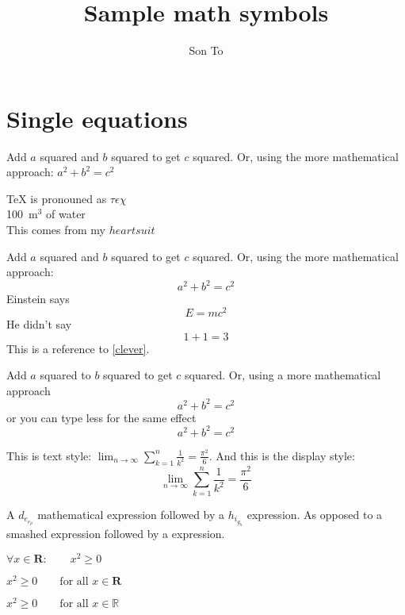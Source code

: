 \documentclass[a4paper,11pt]{report}
\author{Son To}
\title{Sample math symbols}
\begin{document}
\maketitle
\tableofcontents
\chapter{Single equations}
Add $a$ squared and $b$ squared to get $c$ squared. Or,
using the more mathematical approach:
$a^2 + b^2 = c^2$ %

\TeX{} is pronouned as $\tau\epsilon\chi$\\[5pt] %
100~m$^3$ of water\\[5pt]
This comes from my $heartsuit$

Add $a$ squared and $b$ squared to get $c$ squared. Or,
using the more mathematical approach:
\begin{equation}
  a^2 + b^2 = c^2 %
\end{equation}
Einstein says
\begin{equation}
  E = mc^2 \label{clever}
\end{equation}
He didn't say
\begin{equation}
  1 + 1 = 3 \tag{bollocks}
\end{equation}
This is a reference to \eqref{clever}.

Add $a$ squared to $b$ squared to get $c$ squared. Or, using
a more mathematical approach
\begin{equation*}
  a^2 + b^2 = c^2
\end{equation*}
or you can type less for the same effect
\[ a^2 + b^2 = c^2 \]

This is text style: $\lim_{n \to \infty}
\sum_{k=1}^n \frac{1}{k^2} = \frac{\pi^2}{6}$.
And this is the display style:
\begin{equation}
  \lim_{n \to \infty} \sum_{k=1}^n \frac{1}{k^2}
  = \frac{\pi^2}{6}
\end{equation}

A $d_{e_{e_p}}$ mathematical expression followed
by a $h_{i_{g_h}}$ expression. As opposed to a smashed
 expression followed by a
 expression.

$\forall x \in \mathbf{R}: \qquad x^2 \geq 0$

$x^{2} \geq 0 \qquad \text{for all } x \in \mathbf{R}$

$x^{2} \geq 0 \qquad \text{for all } x \in \mathbb{R}$
\end{document}
